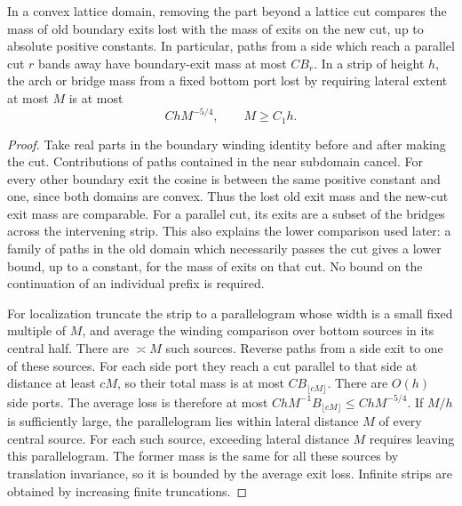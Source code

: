 \begin{lemma}
\label{lem:08-localization}
In a convex lattice domain, removing the part beyond a lattice cut compares
the mass of old boundary exits lost with the mass of exits on the new cut,
up to absolute positive constants. In particular, paths from a side which
reach a parallel cut \(r\) bands away have boundary-exit mass at most
\(C B_r\). In a strip of height \(h\), the arch or bridge mass from a fixed
bottom port lost by requiring lateral extent at most \(M\) is at most
\[
 C h M^{-5/4},\qquad M\ge C_1h.
\]
\end{lemma}
\begin{proof}
Take real parts in the boundary winding identity before and after making
the cut. Contributions of paths contained in the near subdomain cancel.
For every other boundary exit the cosine is between the same positive
constant and one, since both domains are convex. Thus the lost old exit
mass and the new-cut exit mass are comparable. For a parallel cut, its
exits are a subset of the bridges across the intervening strip. This also
explains the lower comparison used later: a family of paths in the old
domain which necessarily passes the cut gives a lower bound, up to a
constant, for the mass of exits on that cut. No bound on the continuation
of an individual prefix is required.

For localization truncate the strip to a parallelogram whose width is a
small fixed multiple of \(M\), and average the winding comparison over
bottom sources in its central half. There are \(\asymp M\) such sources.
Reverse paths from a side exit to one of these sources. For each side port
they reach a cut parallel to that side at distance at least \(cM\), so their
total mass is at most \(C B_{\lfloor cM\rfloor}\). There are \(O(h)\)
side ports. The average loss is therefore at most
\(C h M^{-1}B_{\lfloor cM\rfloor}\le C hM^{-5/4}\).
If \(M/h\) is sufficiently large, the parallelogram lies within lateral
distance \(M\) of every central source. For each such source, exceeding
lateral distance $M$ requires leaving this parallelogram. The former mass
is the same for all these sources by translation invariance, so it is
bounded by the average exit loss.
Infinite strips are obtained by increasing finite truncations.
\end{proof}

